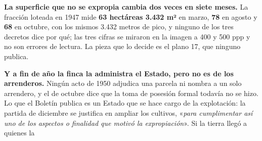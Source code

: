 \begin{cautela}
\textbf{La superficie que no se expropia cambia dos veces en siete meses.} La fracción loteada en
1947 mide \textbf{63 hectáreas 3.432 m²} en marzo, \textbf{78} en agosto y \textbf{68} en octubre,
con los mismos 3.432 metros de pico, y ninguno de los tres decretos dice por qué; las tres cifras se
miraron en la imagen a 400 y 500 ppp y no son errores de lectura. La pieza que lo decide es el plano
17, que ninguno publica.

\textbf{Y a fin de año la finca la administra el Estado, pero no es de los arrenderos.} Ningún acto
de 1950 adjudica una parcela ni nombra a un solo arrendero, y el de octubre dice que la toma de
posesión formal todavía no se hizo. Lo que el Boletín publica es un Estado que se hace cargo de la
explotación: la partida de diciembre se justifica en ampliar los cultivos, «\textit{para cumplimentar
así uno de los aspectos o finalidad que motivó la expropiación}». Si la tierra llegó a quienes la

\end{cautela}
